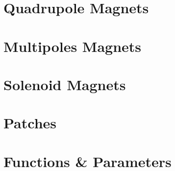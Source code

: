 \documentclass{cern-art} %
\begin{document}
\section{Quadrupole Magnets}

\section{Multipoles Magnets}

\section{Solenoid Magnets}

\section{Patches}

\section{Functions \& Parameters}
\end{document}
